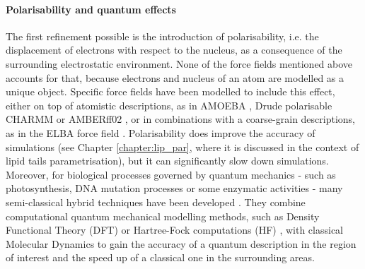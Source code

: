 \paragraph{Polarisability and quantum effects}
The first refinement possible is the introduction of polarisability, i.e. the displacement of electrons with respect to the nucleus, as a consequence of the surrounding electrostatic environment. None of the force fields mentioned above accounts for that, because electrons and nucleus of an atom are modelled as a unique object. Specific force fields have been modelled to include this effect, either on top of atomistic descriptions, as in AMOEBA \cite{Ren2003,Ponder2010}, Drude polarisable CHARMM \cite{Anisimov2004} or AMBERff02 \cite{Cieplak2001}, or in combinations with a coarse-grain descriptions, as in the ELBA force field \cite{Orsi2011}. Polarisability does improve the accuracy of simulations (see Chapter \ref{chapter:lip_par}, where it is discussed in the context of lipid tails parametrisation), but it can significantly slow down simulations.
%
Moreover, for biological processes governed by quantum mechanics - such as photosynthesis, DNA mutation processes or some enzymatic activities - many semi-classical hybrid techniques have been developed \cite{Ahmadi2018}. They combine computational quantum mechanical modelling methods, such as Density Functional Theory (DFT) or Hartree-Fock computations (HF) \cite{Shao2015}, with classical Molecular Dynamics to gain the accuracy of a quantum description in the region of interest and the speed up of a classical one in the surrounding areas.

